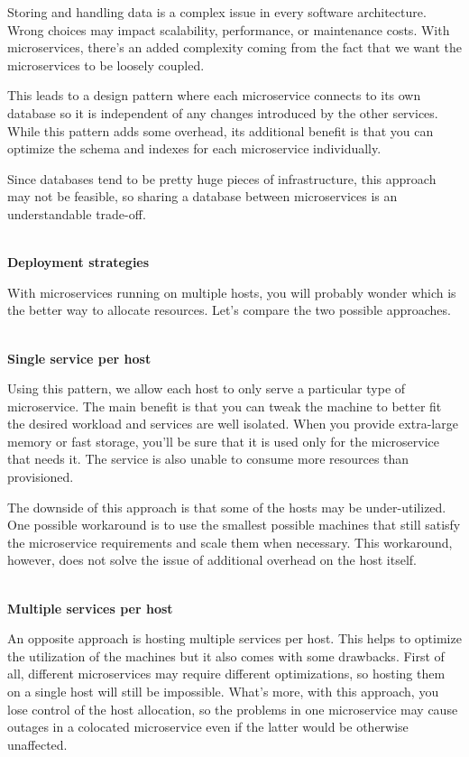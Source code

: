 Storing and handling data is a complex issue in every software architecture. Wrong choices may impact scalability, performance, or maintenance costs. With microservices, there's an added complexity coming from the fact that we want the microservices to be loosely coupled.

This leads to a design pattern where each microservice connects to its own database so it is independent of any changes introduced by the other services. While this pattern adds some overhead, its additional benefit is that you can optimize the schema and indexes for each microservice individually.

Since databases tend to be pretty huge pieces of infrastructure, this approach may not be feasible, so sharing a database between microservices is an understandable trade-off.

\hspace*{\fill} \\ %
\noindent
\textbf{Deployment strategies}

With microservices running on multiple hosts, you will probably wonder which is the better way to allocate resources. Let's compare the two possible approaches.

\hspace*{\fill} \\ %
\noindent
\textbf{Single service per host}

Using this pattern, we allow each host to only serve a particular type of microservice. The main benefit is that you can tweak the machine to better fit the desired workload and services are well isolated. When you provide extra-large memory or fast storage, you'll be sure that it is used only for the microservice that needs it. The service is also unable to consume more resources than provisioned.

The downside of this approach is that some of the hosts may be under-utilized. One possible workaround is to use the smallest possible machines that still satisfy the microservice requirements and scale them when necessary. This workaround, however, does not solve the issue of additional overhead on the host itself.

\hspace*{\fill} \\ %
\noindent
\textbf{Multiple services per host}

An opposite approach is hosting multiple services per host. This helps to optimize the utilization of the machines but it also comes with some drawbacks. First of all, different microservices may require different optimizations, so hosting them on a single host will still be impossible. What's more, with this approach, you lose control of the host allocation, so the problems in one microservice may cause outages in a colocated microservice even if the latter would be otherwise unaffected.

